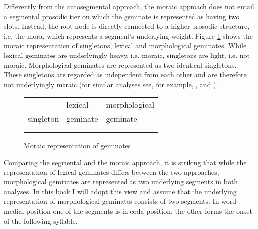 Differently from the autosegmental approach, the moraic approach does not entail a segmental prosodic tier on which the geminate is represented as having two slots. Instead, the root-node is directly connected to a higher prosodic structure, i.e. the mora, which represents a segment's underlying weight. Figure \ref{fig:Moraic representation of geminates} shows the moraic representation of singletons, lexical and morphological geminates. While lexical geminates are underlyingly heavy, i.e. moraic, singletons are light, i.e. not moraic. Morphological geminates are represented as two identical singletons. These singletons are regarded as independent from each other and are therefore not underlyingly moraic  (for similar analyses see, for example,  \citealt[14]{Ham.2001}, \citealt[17]{Davis.2014} and \citealt{Davis.2017}).


\begin{figure} [h]
	\centering
	
	
	\begin{tabularx}{.8\linewidth}{YYY}
		
		&		lexical			 & 		 morphological \\
		
		singleton	&			  geminate	 & 			  geminate\\		
		\\
		\begin{tikzpicture}
		\Tree [.C  ] 					
		\end{tikzpicture}												&
		
		
		\begin{tikzpicture}[grow'=up]
		\Tree  [.C $\mu$ ]
		\end{tikzpicture}			
		&
		
		\begin{tikzpicture}[grow'=up]
		\Tree  [.C ]
		\end{tikzpicture}
		\begin{tikzpicture}[grow'=up]
		\Tree  [.C  ]
		\end{tikzpicture}		
		
	\end{tabularx}
	
	\caption{Moraic representation of geminates} 
	\label{fig:Moraic representation of geminates}
\end{figure}


Comparing the segmental and the moraic approach, it is striking that while the representation of lexical geminates differs between the two approaches, morphological geminates are represented as two underlying segments in both analyses.
In this book I will adopt this view and assume that the underlying representation of morphological geminates consists of two segments. In word-medial position one of the segments is in coda position, the other forms the onset of the following syllable. 


